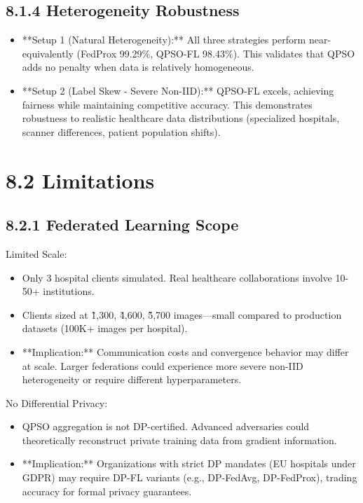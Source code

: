 \subsection{8.1.4 Heterogeneity Robustness}
\begin{itemize}
  \item **Setup 1 (Natural Heterogeneity):** All three strategies perform near-equivalently (FedProx 99.29\%, QPSO-FL 98.43\%). This validates that QPSO adds no penalty when data is relatively homogeneous.
  \item **Setup 2 (Label Skew - Severe Non-IID):** QPSO-FL excels, achieving fairness while maintaining competitive accuracy. This demonstrates robustness to realistic healthcare data distributions (specialized hospitals, scanner differences, patient population shifts).
\end{itemize}


\section{8.2 Limitations}

\subsection{8.2.1 Federated Learning Scope}
Limited Scale:

\begin{itemize}
  \item Only 3 hospital clients simulated. Real healthcare collaborations involve 10-50+ institutions.
  \item Clients sized at \~1,300, \~4,600, \~5,700 images—small compared to production datasets (100K+ images per hospital).
  \item **Implication:** Communication costs and convergence behavior may differ at scale. Larger federations could experience more severe non-IID heterogeneity or require different hyperparameters.
\end{itemize}

No Differential Privacy:

\begin{itemize}
  \item QPSO aggregation is not DP-certified. Advanced adversaries could theoretically reconstruct private training data from gradient information.
  \item **Implication:** Organizations with strict DP mandates (EU hospitals under GDPR) may require DP-FL variants (e.g., DP-FedAvg, DP-FedProx), trading accuracy for formal privacy guarantees.
\end{itemize}

